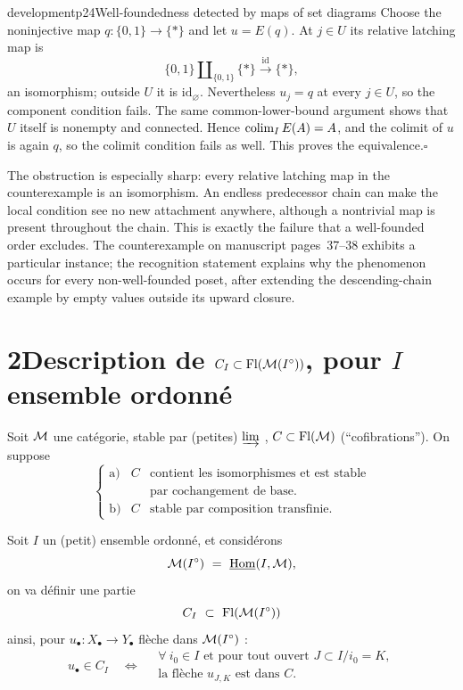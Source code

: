 \begin{dcomment}{development}{p24}{Well-foundedness detected by maps of set diagrams}
Choose the noninjective map $q:\{0,1\}\to\{*\}$ and let $u=E(q)$. At $j\in U$ its relative latching map is
\[
 \{0,1\}\amalg_{\{0,1\}}\{*\}
       \xrightarrow{\mathrm{id}}\{*\},
\]
an isomorphism; outside $U$ it is $\mathrm{id}_{\varnothing}$. Nevertheless $u_j=q$ at every $j\in U$, so the component condition fails. The same common-lower-bound argument shows that $U$ itself is nonempty and connected. Hence $\mathop{\rm colim}_I E(A)=A$, and the colimit of $u$ is again $q$, so the colimit condition fails as well. This proves the equivalence.\hfill$\square$

The obstruction is especially sharp: every relative latching map in the counterexample is an isomorphism. An endless predecessor chain can make the local condition see no new attachment anywhere, although a nontrivial map is present throughout the chain. This is exactly the failure that a well-founded order excludes. The counterexample on manuscript pages~37--38 exhibits a particular instance; the recognition statement explains why the phenomenon occurs for every non-well-founded poset, after extending the descending-chain example by empty values outside its upward closure.
\end{dcomment}


\section*{2\quad Description de $C_I \subset \mathrm{Fl}(\mathcal{M}(I^\circ))$, pour $I$ ensemble ordonné}

Soit $\mathcal{M}$ une catégorie, stable par (petites) $\varinjlim$ , $C \subset \mathrm{Fl}(\mathcal{M})$ (“cofibrations”). On suppose
\[
\left\{
\begin{array}{lll}
\text{a)} & C & \text{contient les isomorphismes et est stable}\\
 & & \text{par cochangement de base.}\\[1ex]
\text{b)} & C & \text{stable par composition transfinie.}
\end{array}
\right.
\tag*{(2.1)}
\]

Soit $I$ un (petit) ensemble ordonné, et considérons
\[
\M(I^\circ) \ =\ \underline{\mathrm{Hom}}(I,\M),
\]
on va définir une partie
\[
C_I \ \subset\ \mathrm{Fl}(\mathcal{M}(I^\circ))
\]
ainsi, pour $u_\bullet : X_\bullet \longrightarrow Y_\bullet$ flèche dans $\mathcal{M}(I^\circ)$ :
\[
u_\bullet \in C_I \quad\Longleftrightarrow\quad
\begin{array}{l}
\forall\ i_0 \in I \text{ et pour tout ouvert } J \subset I/i_0 = K,\\
\text{la flèche } u_{J,K} \text{ est dans } C.
\end{array}
\tag*{(2.2)}
\]

